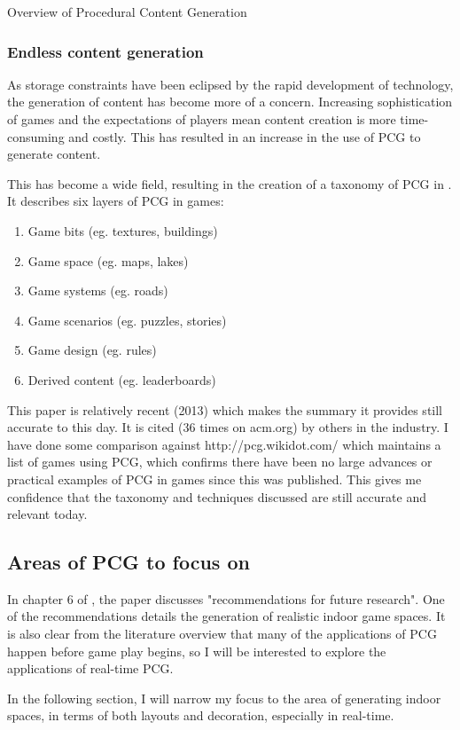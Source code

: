\documentclass[review]{cmpreport}
\begin{document}
\begin{section}{Overview of Procedural Content Generation}
\subsubsection{Endless content generation}
As storage constraints have been eclipsed by the rapid development of technology, the generation of content has become more of a concern. Increasing sophistication of games and the expectations of players mean content creation is more time-consuming and costly. This has resulted in an increase in the use of PCG to generate content. \par
This has become a wide field, resulting in the creation of a taxonomy of PCG in \cite{Hendrikx:2013:PCG:2422956.2422957}. It describes six layers of PCG in games:
\begin{enumerate}
    \item Game bits (eg. textures, buildings)
    \item Game space (eg. maps, lakes)
    \item Game systems (eg. roads)
    \item Game scenarios (eg. puzzles, stories)
    \item Game design (eg. rules)
    \item Derived content (eg. leaderboards)
\end{enumerate}

This paper is relatively recent (2013) which makes the summary it provides still accurate to this day. It is cited (36 times on acm.org) by others in the industry. I have done some comparison against http://pcg.wikidot.com/ which maintains a list of games using PCG, which confirms there have been no large advances or practical examples of PCG in games since this was published. This gives me confidence that the taxonomy and techniques discussed are still accurate and relevant today. \par 

\subsection{Areas of PCG to focus on}
In chapter 6 of \cite{Hendrikx:2013:PCG:2422956.2422957}, the paper discusses "recommendations for future research". One of the recommendations details the generation of realistic indoor game spaces. It is also clear from the literature overview that many of the applications of PCG happen before game play begins, so I will be interested to explore the applications of real-time PCG. \par
In the following section, I will narrow my focus to the area of generating indoor spaces, in terms of both layouts and decoration, especially in real-time.

\end{section}
\end{document}
